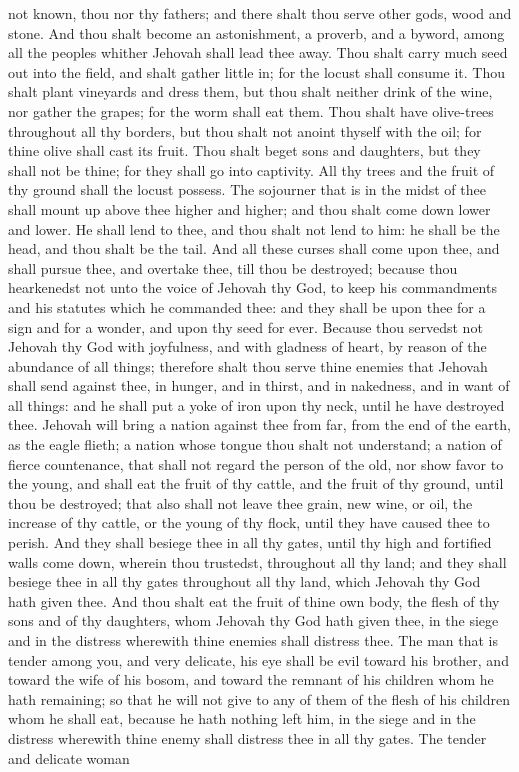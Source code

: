 not known, thou nor thy fathers; and there shalt thou serve other gods, wood and stone. And thou shalt become an astonishment, a proverb, and a byword, among all the peoples whither Jehovah shall lead thee away. Thou shalt carry much seed out into the field, and shalt gather little in; for the locust shall consume it. Thou shalt plant vineyards and dress them, but thou shalt neither drink of the wine, nor gather the grapes; for the worm shall eat them. Thou shalt have olive-trees throughout all thy borders, but thou shalt not anoint thyself with the oil; for thine olive shall cast its fruit. Thou shalt beget sons and daughters, but they shall not be thine; for they shall go into captivity. All thy trees and the fruit of thy ground shall the locust possess. The sojourner that is in the midst of thee shall mount up above thee higher and higher; and thou shalt come down lower and lower. He shall lend to thee, and thou shalt not lend to him: he shall be the head, and thou shalt be the tail. And all these curses shall come upon thee, and shall pursue thee, and overtake thee, till thou be destroyed; because thou hearkenedst not unto the voice of Jehovah thy God, to keep his commandments and his statutes which he commanded thee: and they shall be upon thee for a sign and for a wonder, and upon thy seed for ever.  Because thou servedst not Jehovah thy God with joyfulness, and with gladness of heart, by reason of the abundance of all things; therefore shalt thou serve thine enemies that Jehovah shall send against thee, in hunger, and in thirst, and in nakedness, and in want of all things: and he shall put a yoke of iron upon thy neck, until he have destroyed thee. Jehovah will bring a nation against thee from far, from the end of the earth, as the eagle flieth; a nation whose tongue thou shalt not understand; a nation of fierce countenance, that shall not regard the person of the old, nor show favor to the young, and shall eat the fruit of thy cattle, and the fruit of thy ground, until thou be destroyed; that also shall not leave thee grain, new wine, or oil, the increase of thy cattle, or the young of thy flock, until they have caused thee to perish. And they shall besiege thee in all thy gates, until thy high and fortified walls come down, wherein thou trustedst, throughout all thy land; and they shall besiege thee in all thy gates throughout all thy land, which Jehovah thy God hath given thee. And thou shalt eat the fruit of thine own body, the flesh of thy sons and of thy daughters, whom Jehovah thy God hath given thee, in the siege and in the distress wherewith thine enemies shall distress thee. The man that is tender among you, and very delicate, his eye shall be evil toward his brother, and toward the wife of his bosom, and toward the remnant of his children whom he hath remaining; so that he will not give to any of them of the flesh of his children whom he shall eat, because he hath nothing left him, in the siege and in the distress wherewith thine enemy shall distress thee in all thy gates. The tender and delicate woman 